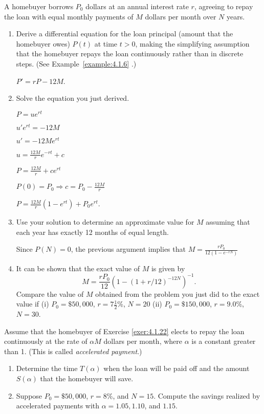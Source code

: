 \documentclass{ximera}
\begin{document}
\begin{problem}\label{exer:4.1.22}
A homebuyer borrows $P_0$ dollars at an annual interest rate $r$,
agreeing to repay the loan with equal monthly payments of $M$ dollars
per month over $N$ years.

\begin{enumerate} \item %
Derive a
differential equation for the loan principal (amount that the
homebuyer owes) $P(t)$ at time $t>0$, making the simplifying
assumption that the homebuyer repays the loan continuously rather than
in discrete steps. (See Example~\ref{example:4.1.6} .)
\begin{solution}
    $P'=rP-12M$.
\end{solution}

\item %
Solve the equation you just derived.
\begin{solution}
$P=ue^{rt}$

$u'e^{rt}=-12M$

$u'=-12Me^{rt}$

$u=\frac{12M}{r}e^{-rt}+c$

$P=\frac{12M}{r}+ce^{rt}$

$P(0)=P_0\Rightarrow c=P_0-\frac{12M}{r}$

$P=\frac{12M}{r}(1-e^{rt})+P_0e^{rt}$.
\end{solution}

\item %
 Use your solution to determine an approximate
value for $M$  assuming that each year has exactly 12 months of
equal length.
\begin{solution}
Since $P(N)=0$, the previous argument implies that
 $M=\frac{rP_0}{12(1-e^{-rN})}$
\end{solution}

\item %
 It can be shown that the exact value of $M$  is given by
$$
M=\frac{rP_0 }{ 12}\left(1-(1+r/12)^{-12N}\right)^{-1}.
$$
Compare the value of $M$ obtained from the problem you just did to the
exact value  if
 (i) $P_0=\$50,000$, $r=7\frac{1}{2}$\%, $N=20$
 (ii) $P_0=\$150,000$, $r=9.0$\%, $N=30$.
\end{enumerate}
\end{problem}

\begin{problem}\label{exer:4.1.23}
Assume that the homebuyer of Exercise \ref{exer:4.1.22} elects to repay the
loan continuously at the rate of $\alpha M$ dollars per month,
where $\alpha$ is a constant greater than 1. (This is called \emph{
accelerated payment}.)
\begin{enumerate}
\item %
 Determine the time $T(\alpha)$ when the loan
will be paid off and the amount $S(\alpha)$ that the homebuyer will save.

\item %
 Suppose $P_0=\$50,000$, $r=8$\%, and $N=15$.
Compute
the savings realized by accelerated payments with $\alpha=1.05,1.10$, and
$1.15$.
\end{enumerate}
\end{problem}
\end{document}
